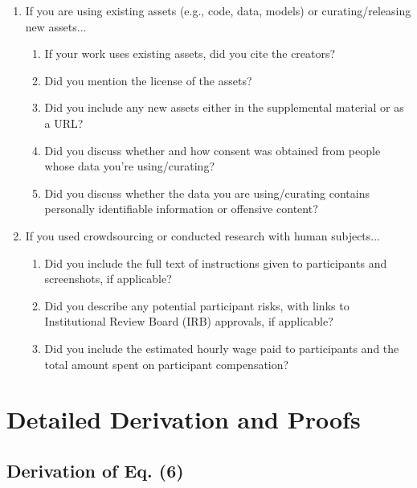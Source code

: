 \documentclass{article}
\begin{document}
\begin{enumerate}
\item If you are using existing assets (e.g., code, data, models) or curating/releasing new assets...
\begin{enumerate}
  \item If your work uses existing assets, did you cite the creators?
  \item Did you mention the license of the assets?
  \item Did you include any new assets either in the supplemental material or as a URL?
  \item Did you discuss whether and how consent was obtained from people whose data you're using/curating?
  \item Did you discuss whether the data you are using/curating contains personally identifiable information or offensive content?
\end{enumerate}

\item If you used crowdsourcing or conducted research with human subjects...
\begin{enumerate}
  \item Did you include the full text of instructions given to participants and screenshots, if applicable?
    \answerNA{}
  \item Did you describe any potential participant risks, with links to Institutional Review Board (IRB) approvals, if applicable?
    \answerNA{}
  \item Did you include the estimated hourly wage paid to participants and the total amount spent on participant compensation?
    \answerNA{}
\end{enumerate}

\end{enumerate}


\newpage

\appendix

\section{Detailed Derivation and Proofs}

\subsection{Derivation of Eq. (6)}
\end{document}
